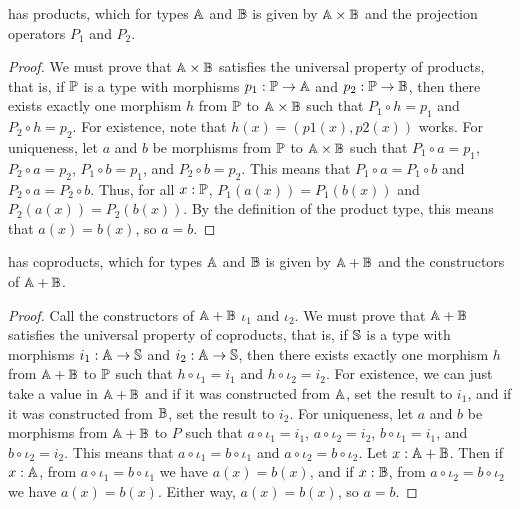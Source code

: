 \documentclass[../../math.tex]{subfiles}
\begin{document}
\begin{theorem}
    \Type has products, which for types $\A$ and $\B$ is given by $\A \times \B$
    and the projection operators $P_1$ and $P_2$.
\end{theorem}
\begin{proof}
    We must prove that $\A \times \B$ satisfies the universal property of
    products, that is, if $\P$ is a type with morphisms $p_1 : \P \to \A$ and
    $p_2 : \P \to \B$, then there exists exactly one morphism $h$ from $\P$ to
    $\A \times \B$ such that $P_1 \circ h = p_1$ and $P_2 \circ h = p_2$.
    For existence, note that $h(x) = (p1(x), p2(x))$ works.  For uniqueness, let
    $a$ and $b$ be morphisms from $\P$ to $\A \times \B$ such that $P_1 \circ a
    = p_1$, $P_2 \circ a = p_2$, $P_1 \circ b = p_1$, and $P_2 \circ b = p_2$.
    This means that $P_1 \circ a = P_1 \circ b$ and $P_2 \circ a = P_2 \circ b$.
    Thus, for all $x : \P$, $P_1(a(x)) = P_1(b(x))$ and $P_2(a(x)) = P_2(b(x))$.
    By the definition of the product type, this means that $a(x) = b(x)$, so $a
    = b$.
\end{proof}

\begin{theorem}
    \Type has coproducts, which for types $\A$ and $\B$ is given by $\A + \B$
    and the constructors of $\A + \B$.
\end{theorem}
\begin{proof}
    Call the constructors of $\A + \B$ $\iota_1$ and $\iota_2$.  We must prove
    that $\A + \B$ satisfies the universal property of coproducts, that is, if
    $\S$ is a type with morphisms $i_1 : \A \to \S$ and $i_2 : \A \to \S$, then
    there exists exactly one morphism $h$ from $\A + \B$ to $\P$ such that $h
    \circ \iota_1 = i_1$ and $h \circ \iota_2 = i_2$.  For existence, we can
    just take a value in $\A + \B$ and if it was constructed from $\A$, set the
    result to $i_1$, and if it was constructed from $\B$, set the result to
    $i_2$.  For uniqueness, let $a$ and $b$ be morphisms from $\A + \B$ to $P$
    such that $a \circ \iota_1 = i_1$, $a \circ \iota_2 = i_2$, $b \circ \iota_1
    = i_1$, and $b \circ \iota_2 = i_2$.  This means that $a \circ \iota_1 = b
    \circ \iota_1$ and $a \circ \iota_2 = b \circ \iota_2$.  Let $x : \A + \B$.
    Then if $x : \A$, from $a \circ \iota_1 = b \circ \iota_1$ we have $a(x) =
    b(x)$, and if $x : \B$, from $a \circ \iota_2 = b\circ \iota_2$ we have
    $a(x) = b(x)$.  Either way, $a(x) = b(x)$, so $a = b$.
\end{proof}
\end{document}
